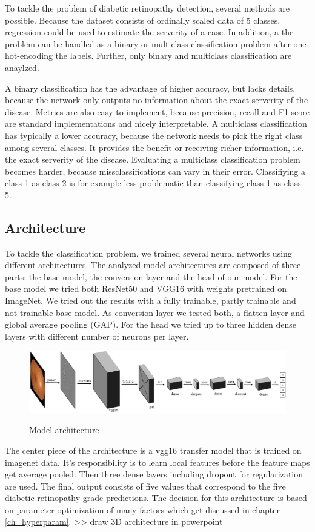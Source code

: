 \documentclass{article}
\begin{document}
To tackle the problem of diabetic retinopathy detection, several methods are possible. Because the dataset consists of 
ordinally scaled data of 5 classes, regression could be used to estimate the serverity of a case. In addition, a the problem 
can be handled as a binary or multiclass classification problem after one-hot-encoding the labels.
Further, only binary and multiclass classification are anaylzed.

A binary classification has the advantage of higher accuracy, but lacks details, because the network only outputs no 
information about the exact serverity of the disease. Metrics are also easy to implement, because precision, 
recall and F1-score are standard implementations and nicely interpretable. A multiclass classification has typically a 
lower accuracy, because the network needs to pick the right class among 
several classes. It provides the benefit or receiving richer information, i.e. the exact serverity of the disease.
Evaluating a multiclass classification problem becomes harder, because missclassifications can vary in their error.
Classifiying a class 1 as class 2 is for example less problematic than classifying class 1 as class 5.


\subsection{Architecture}
To tackle the classification problem, we trained several neural networks using different architectures.
The analyzed model architectures are composed of three parts: the 
base model, the conversion layer and the head of our model. For the base model we tried both ResNet50 and VGG16 with 
weights pretrained on ImageNet. We tried out the results with a fully trainable, partly trainable and not trainable
base model. As conversion layer we tested both, a flatten layer and global average pooling (GAP).
For the head we tried up to three hidden dense layers with different number of neurons per layer.
\begin{figure}[h]
  \centering
  \includegraphics[width=1\textwidth]{2_2_architecture.png}\label{fig:architecture}
  \caption{Model architecture}
\end{figure}
The center piece of the architecture is a vgg16 transfer model that is trained on imagenet data. 
It's responsibility is to learn local features before the feature maps get average pooled.
Then three dense layers including dropout for regularization are used. The final output consists of five values that correspond
to the five diabetic retinopathy grade predictions.
The decision for this architecture is based on parameter optimization of many factors which get discussed in chapter \ref{ch_hyperparam}.
>> draw 3D architecture in powerpoint
\end{document}
